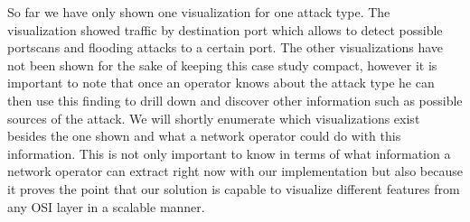 So far we have only shown one visualization for one attack type. The visualization showed traffic by destination port which allows to detect possible portscans and flooding attacks to a certain port. The other visualizations have not been shown for the sake of keeping this case study compact, however it is important to note that once an operator knows about the attack type he can then use this finding to drill down and discover other information such as possible sources of the attack. We will shortly enumerate which visualizations exist besides the one shown and what a network operator could do with this information. This is not only important to know in terms of what information a network operator can extract right now with our implementation but also because it proves the point that our solution is capable to visualize different features from any OSI layer in a scalable manner.

